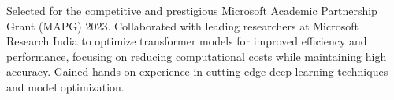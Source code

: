 
Selected for the competitive and prestigious Microsoft Academic Partnership Grant (MAPG) 2023. Collaborated with leading researchers at Microsoft Research India to optimize transformer models for improved efficiency and performance, focusing on reducing computational costs while maintaining high accuracy. Gained hands-on experience in cutting-edge deep learning techniques and model optimization.








